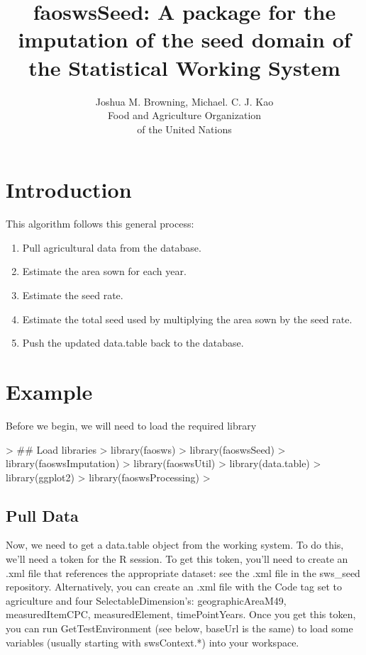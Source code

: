 \documentclass[nojss]{jss}
\title{\bf faoswsSeed: A package for the imputation of
  the seed domain of the Statistical Working System}
\author{Joshua M. Browning, Michael. C. J. Kao\\ Food and Agriculture Organization \\ of
  the United Nations}
\begin{document}



\section{Introduction}

This algorithm follows this general process:

\begin{enumerate}
    \item Pull agricultural data from the database.
    \item Estimate the area sown for each year.
    \item Estimate the seed rate.
    \item Estimate the total seed used by multiplying the area sown by the seed
    rate.
    \item Push the updated data.table back to the database.
\end{enumerate}

\section{Example}

Before we begin, we will need to load the required library

\begin{Schunk}
\begin{Sinput}
> ## Load libraries
> library(faosws)
> library(faoswsSeed)
> library(faoswsImputation)
> library(faoswsUtil)
> library(data.table)
> library(ggplot2)
> library(faoswsProcessing)
> 
\end{Sinput}
\end{Schunk}

\subsection{Pull Data}

Now, we need to get a data.table object from the working system.  To do this,
we'll need a token for the R session.  To get this token, you'll need to create
an .xml file that references the appropriate dataset: see the .xml file in the
sws\_seed repository.  Alternatively, you can create an .xml file with the Code
tag set to agriculture and four SelectableDimension's: geographicAreaM49, 
measuredItemCPC, measuredElement, timePointYears.  Once you get this token, you
can run GetTestEnvironment (see below, baseUrl is the same) to load some
variables (usually starting with swsContext.*) into your workspace.
\end{document}
